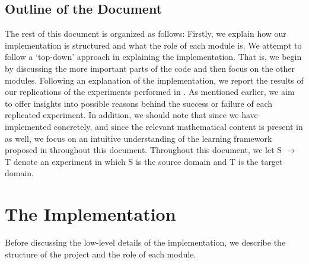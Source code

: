 \documentclass[14pt]{extarticle}
\begin{document}
		\subsection{Outline of the Document}
		The rest of this document is organized as follows: Firstly, we explain how our implementation is structured and what the role of each module is. We attempt to follow a `top-down' approach in explaining the implementation. That is, we begin by discussing the more important parts of the code and then focus on the other modules. Following an explanation of the implementation, we report the results of our replications of the experiments performed in \cite{adda}. As mentioned earlier, we aim to offer insights into possible reasons behind the success or failure of each replicated experiment. In addition, we should note that since we have implemented \cite{adda} concretely, and since the relevant mathematical content is present in \cite{adda} as well, we focus on an intuitive understanding of the learning framework proposed in \cite{adda} throughout this document. Throughout this document, we let S $\rightarrow$ T denote an experiment in which S is the source domain and T is the target domain.
		\pagebreak
		\section{The Implementation}
		Before discussing the low-level details of the implementation, we describe the structure of the project and the role of each module.
\end{document}
